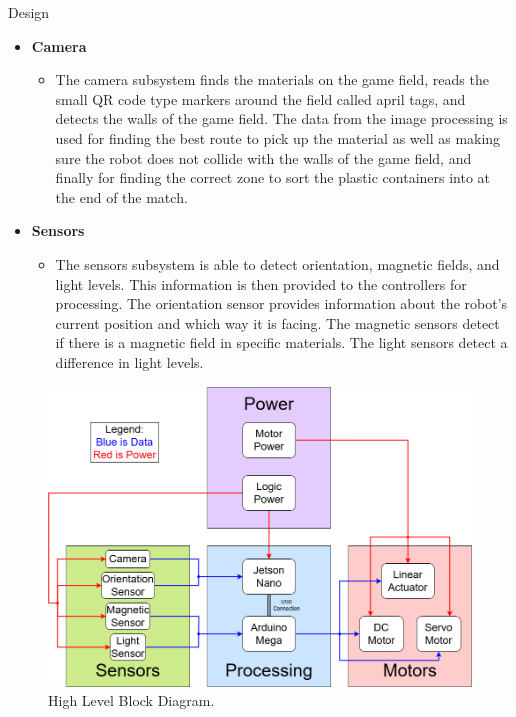 \documentclass[final]{beamer}
\newlength{\colwidth}
\begin{document}
\begin{frame}[t]
\begin{columns}[t]
\begin{column}{\colwidth}
\begin{block}{Design}
\begin{itemize}
      \item \textbf{Camera}
        \begin{itemize}
          \item The camera subsystem finds the materials on the game field, reads the small QR code type markers around the field called april tags, and detects the walls of the game field. The data from the image processing is used for finding the best route to pick up the material as well as making sure the robot does not collide with the walls of the game field, and finally for finding the correct zone to sort the plastic containers into at the end of the match.
        \end{itemize}
      
      \item \textbf{Sensors}
        \begin{itemize}
          \item The sensors subsystem is able to detect orientation, magnetic fields, and light levels. This information is then provided to the controllers for processing. The orientation sensor provides information about the robot's current position and which way it is facing. The magnetic sensors detect if there is a magnetic field in specific materials. The light sensors detect a difference in light levels.
        \end{itemize}
    
    \end{itemize}

    \begin{figure}
      \centering
      \includegraphics[width=20.0cm]{High_Block_Diagram.png}
      \caption{High Level Block Diagram.}
    \end{figure}
  

\end{block}
\end{column}
\end{columns}
\end{frame}
\end{document}
